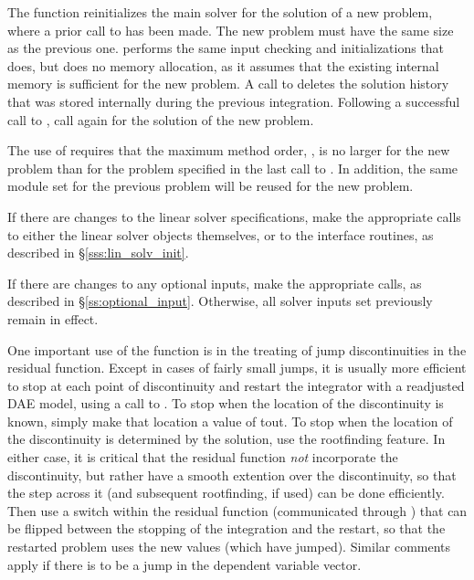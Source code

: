 {The function  reinitializes the main {\idas} solver for
the solution of a new problem, where a prior call to  has
been made. The new problem must have the same size as the previous one.
 performs the same input checking and initializations
that  does, but does no memory allocation, as it assumes that
the existing internal memory is sufficient for the new problem.
A call to  deletes the solution history that was stored
internally during the previous integration.  Following a successful call to
, call  again for the solution of the new problem.

The use of  requires that the maximum method order,
, is no larger for the new problem than for the problem
specified in the last call to .  In addition, the same
{\nvector} module set for the previous problem
will be reused for the new problem.

If there are changes to the linear solver specifications, make the
appropriate calls to either the linear solver objects themselves, or
to the {\idals} interface routines, as described in
\S\ref{sss:lin_solv_init}.

If there are changes to any optional inputs, make the appropriate
 calls, as described in \S\ref{ss:optional_input}.
Otherwise, all solver inputs set previously remain in effect.

One important use of the  function is in the treating
of jump discontinuities in the residual function.  Except in cases of
fairly small jumps, it is usually more efficient to stop at each point
of discontinuity and restart the integrator with a readjusted DAE
model, using a call to .  To stop when the location of
the discontinuity is known, simply make that location a value of tout.
To stop when the location of the discontinuity is determined by the
solution, use the rootfinding feature.  In either case, it is critical
that the residual function {\it not} incorporate the discontinuity, but
rather have a smooth extention over the discontinuity, so that the
step across it (and subsequent rootfinding, if used) can be done
efficiently.  Then use a switch within the residual function (communicated
through ) that can be flipped between the stopping of
the integration and the restart, so that the restarted problem uses
the new values (which have jumped).  Similar comments apply if there
is to be a jump in the dependent variable vector.

}
